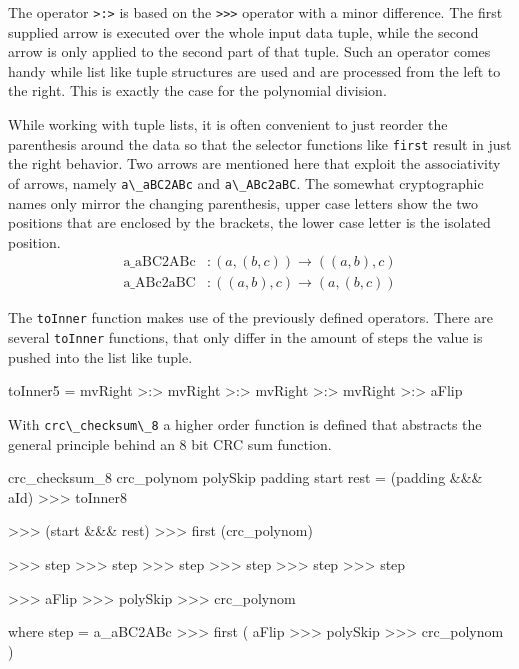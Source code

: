 \documentclass[9pt,final,a4paper,leqno]{article}
\newcommand{\hs}[1]{\mbox{\lstinline[basicstyle=\color{textgray}]!#1!}}
\begin{document}
The operator \hs{>:>} is based on the \hs{>>>} operator with a minor difference. The first supplied arrow is executed over the whole input
data tuple, while the second arrow is only applied to the second part of that tuple. Such an operator comes handy while list like tuple
structures are used and are processed from the left to the right. This is exactly the case for the polynomial division. 


\par
While working with tuple lists, it is often convenient to just reorder the parenthesis around the data so that the selector functions like
\hs{first} result in just the right behavior. Two arrows are mentioned here that exploit the associativity of arrows, namely \hs{a\_aBC2ABc}
and \hs{a\_ABc2aBC}. The somewhat cryptographic names only mirror the changing parenthesis, upper case letters show the two positions that
are enclosed by the brackets, the lower case letter is the isolated position. 
\begin{align*}
  \text{a\_aBC2ABc} &: (a, (b, c)) \rightarrow ((a, b), c) \\
  \text{a\_ABc2aBC} &: ((a, b), c) \rightarrow (a, (b, c))
\end{align*}


\par
The \hs{toInner} function makes use of the previously defined operators. There are several \hs{toInner} functions, that only differ in the
amount of steps the value is pushed into the list like tuple.
\begin{haskell}
toInner5
  =   mvRight
  >:> mvRight
  >:> mvRight
  >:> mvRight
  >:> aFlip
\end{haskell} 


\par
With \hs{crc\_checksum\_8} a higher order function is defined that abstracts the general principle behind an 8 bit CRC sum function.  
\begin{haskell}
crc_checksum_8 crc_polynom polySkip padding start rest
  =   (padding &&& aId)
  >>> toInner8

  >>> (start &&& rest)
  >>> first (crc_polynom)

  >>> step
  >>> step
  >>> step
  >>> step
  >>> step
  >>> step

  >>> aFlip
  >>> polySkip
  >>> crc_polynom

  where step =   a_aBC2ABc
             >>> first 
                 (   aFlip
                 >>> polySkip
                 >>> crc_polynom
                 )   
\end{haskell} 
\end{document}
